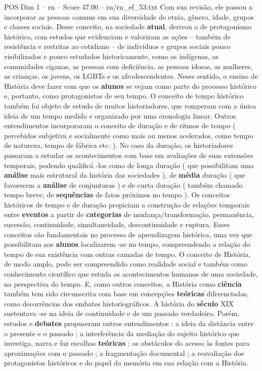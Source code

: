 \begin{textsample}{POS Dim 1 – rn – Score 47.00 – rn/rn\_ef\_53.txt}
Com sua revisão, ele passou a incorporar as pessoas comuns em sua diversidade de etnia, gênero, idade, grupos e classes sociais.
Desse conceito, na sociedade \textbf{atual}, derivou o de protagonismo histórico, com estudos que evidenciam e valorizam as ações – também de resistência e restritas ao cotidiano – de indivíduos e grupos sociais pouco visibilizados e pouco estudados historicamente, como os indígenas, as comunidades ciganas, as pessoas com deficiência, as pessoas idosas, as mulheres, as crianças, os jovens, os LGBTs e os afrodescendentes.
Nesse sentido, o ensino de História deve fazer com que os \textbf{alunos} se vejam como parte do processo histórico e, portanto, como protagonistas de seu tempo.
O conceito de tempo histórico também foi objeto de estudo de muitos historiadores, que romperam com a única ideia de um tempo medido e organizado por uma cronologia linear.
Outros entendimentos incorporaram o conceito de duração e de ritmos de tempo ( percebidos subjetiva e socialmente como mais ou menos acelerados, como tempo de natureza, tempo de fábrica etc. ).
No caso da duração, os historiadores passaram a estudar os acontecimentos com base em avaliações de suas extensões temporais, podendo qualificá -los como de longa duração ( que possibilitam uma \textbf{análise} mais estrutural da história das sociedades ), de \textbf{média} duração ( que favorecem a \textbf{análise} de conjunturas ) e de curta duração ( também chamado tempo breve, de \textbf{sequências} de fatos próximos no tempo ).
Os conceitos históricos de tempo e de duração propiciam a construção de relações temporais entre \textbf{eventos} a partir de \textbf{categorias} de mudança/transformação, permanência, sucessão, continuidade, simultaneidade, descontinuidade e ruptura.
Esses conceitos são fundamentais no processo de aprendizagem histórica, uma vez que possibilitam aos \textbf{alunos} localizarem -se no tempo, compreendendo a relação do tempo de sua existência com outras camadas de tempo.
O conceito de História, de modo amplo, pode ser compreendido como realidade social e também como conhecimento científico que estuda os acontecimentos humanos de uma sociedade, na perspectiva do tempo.
E, como outros conceitos, a História como \textbf{ciência} também tem sido circunscrita com base em concepções \textbf{teóricas} diferenciadas, como decorrências dos embates historiográficos.
A história do \textbf{século} XIX sustentava -se na ideia de continuidade e de um passado verdadeiro.
Porém, estudos e \textbf{debates} propuseram outros entendimentos : a ideia da distância entre o presente e o passado ; a interferência da mediação do sujeito histórico que investiga, narra e faz escolhas \textbf{teóricas} ; os obstáculos do acesso às fontes para aproximações com o passado ; a fragmentação documental ; a reavaliação dos protagonistas históricos e do papel da memória em sua relação com a História.

\end{textsample}
